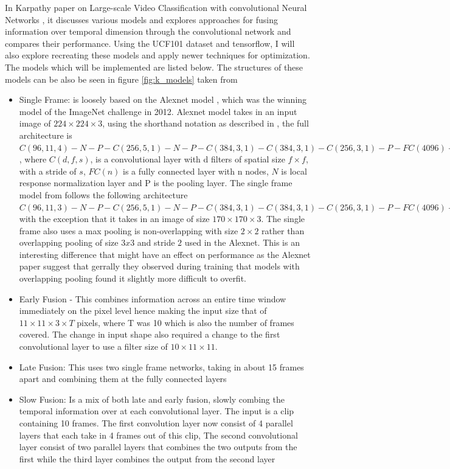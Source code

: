 \documentclass[10pt,phd,a4paper,oneside]{article}
\begin{document}
    In Karpathy paper on Large-scale Video Classification with convolutional Neural Networks \citep{KarpathyCVPR14}, it discusses various models and explores approaches for fusing information over temporal dimension through the convolutional network and compares their performance. Using the UCF101 dataset and tensorflow, I will also explore recreating these models and apply newer techniques for optimization. The models which will be implemented are listed below. The structures of these models can be also be seen in figure \ref{fig:k_models} taken from \citep{KarpathyCVPR14}
    \begin{itemize}
        \item Single Frame: is loosely based on the Alexnet model \cite{NIPS2012_4824}, which was the winning model of the ImageNet challenge in 2012. Alexnet model takes in an input image of $224 \times 224 \times 3$, using the shorthand notation as described in \citep{KarpathyCVPR14}, the full architecture is $C(96, 11, 4)-N-P-C(256, 5, 1)-N-P-C(384, 3, 1)-C(384, 3, 1)-C(256, 3, 1)-P-F C(4096)-F C(4096)$, where $C(d, f, s)$, is a convolutional layer with d filters of spatial size $ f × f$, with a stride of $s$,  $FC(n)$ is a fully connected layer with n nodes, $N$ is local response normalization layer and P is the pooling layer. The single frame model from \cite{KarpathyCVPR14} follows the following architecture  $C(96, 11, 3)-N-P-C(256, 5, 1)-N-P-C(384, 3, 1)-C(384, 3, 1)-C(256, 3, 1)-P-F C(4096)-FC(4096)$ with the exception that it takes in an image of size $ 170 \times 170 \times 3$. The single frame also uses a max pooling is non-overlapping with size $2 \times 2$ rather than overlapping pooling of size $3x3$ and stride $2$ used in the Alexnet. This is an interesting difference that might have an effect on performance as the Alexnet paper suggest that gerrally they observed during training that models with overlapping pooling found it slightly more difficult to overfit.
        \item Early Fusion - This combines information across an entire time window immediately on the pixel level hence making the input size that of $11 \times 11 \times 3 \times T$ pixels, where T was 10 which is also the number of frames covered. The change in input shape also required a change to the first convolutional layer to use a filter size of $10 \times 11 \times 11$.
        \item Late Fusion: This uses two single frame networks, taking in about 15 frames apart and combining them at the fully connected layers
        \item Slow Fusion: Is a mix of both late and early fusion, slowly combing the temporal information over at each convolutional layer. The input is a clip containing 10 frames. The first convolution layer now consist of 4 parallel layers that each take in 4 frames out of this clip, The second convolutional layer consist of two parallel layers that combines the two outputs from the first while the third layer combines the output from the second layer
    \end{itemize}
\end{document}
